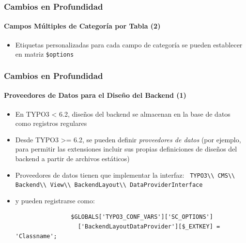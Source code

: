 
\begin{frame}[fragile]
	\frametitle{Cambios en Profundidad}
	\framesubtitle{Campos Múltiples de Categoría por Tabla (2)}

	\begin{itemize}
		\item Etiquetas personalizadas para cada campo de categoría se pueden establecer en matriz \texttt{\$options}

	\end{itemize}

\end{frame}


\begin{frame}[fragile]
	\frametitle{Cambios en Profundidad}
	\framesubtitle{Proveedores de Datos para el Diseño del Backend (1)}

	\begin{itemize}
		\item En TYPO3 < 6.2, diseños del backend se almacenan en la base de datos como registros regulares
		\item Desde TYPO3 >= 6.2, se pueden definir \emph{proveedores de datos}\newline
			\small(por ejemplo, para permitir las extensiones incluir sus propias definiciones de diseños del backend a partir de archivos estáticos)\normalsize

		\item Proveedores de datos tienen que implementar la interfaz:\newline
			\smaller\texttt{
				TYPO3\textbackslash\textbackslash
				CMS\textbackslash\textbackslash
				Backend\textbackslash\textbackslash
				View\textbackslash\textbackslash
				BackendLayout\textbackslash\textbackslash
				DataProviderInterface}\normalsize

		\item y pueden registrarse como:

			\begin{lstlisting}
				$GLOBALS['TYPO3_CONF_VARS']['SC_OPTIONS']
				  ['BackendLayoutDataProvider'][$_EXTKEY] = 'Classname';
			\end{lstlisting}


	\end{itemize}

\end{frame}

